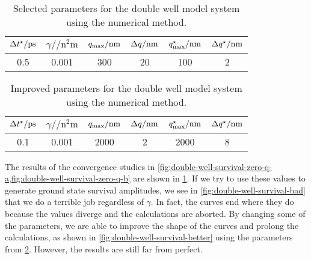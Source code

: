 \begin{table}[H]
	\begin{center}
	\begin{tabular}{ c c c c c c }
		\toprule
		{$\dt\alt / \si{\pico\second}$} & {$\gamma / \si{\per\square\nano\meter}$} & {$q_\mathrm{max} / \si{\nano\meter}$} & {$\Delta q / \si{\nano\meter}$} & {$q_\mathrm{max}^\star / \si{\nano\meter}$} & {$\Delta q^\star / \si{\nano\meter}$} \\
		\midrule
		0.5 & 0.001 & 300 & 20 & 100 & 2 \\
		\bottomrule
	\end{tabular}
	\end{center}
	\caption[
		Selected parameters for double well (numerical)
	]{
		Selected parameters for the double well model system using the numerical method.
	}
	\label{tab:model-sa0-double-well}
\end{table}

\begin{table}[H]
	\begin{center}
	\begin{tabular}{ c c c c c c }
		\toprule
		{$\dt\alt / \si{\pico\second}$} & {$\gamma / \si{\per\square\nano\meter}$} & {$q_\mathrm{max} / \si{\nano\meter}$} & {$\Delta q / \si{\nano\meter}$} & {$q_\mathrm{max}^\star / \si{\nano\meter}$} & {$\Delta q^\star / \si{\nano\meter}$} \\
		\midrule
		0.1 & 0.001 & 2000 & 2 & 2000 & 8 \\
		\bottomrule
	\end{tabular}
	\end{center}
	\caption[
		Improved parameters for double well (numerical)
	]{
		Improved parameters for the double well model system using the numerical method.
	}
	\label{tab:model-sas-double-well}
\end{table}

The results of the convergence studies in \cref{fig:double-well-survival-zero-q-a,fig:double-well-survival-zero-q-b} are shown in \cref{tab:model-sa0-double-well}.
If we try to use these values to generate ground state survival amplitudes, we see in \cref{fig:double-well-survival-bad} that we do a terrible job regardless of $\gamma$.
In fact, the curves end where they do because the values diverge and the calculations are aborted.
By changing some of the parameters, we are able to improve the shape of the curves and prolong the calculations, as shown in \cref{fig:double-well-survival-better} using the parameters from \cref{tab:model-sas-double-well}.
However, the results are still far from perfect.

